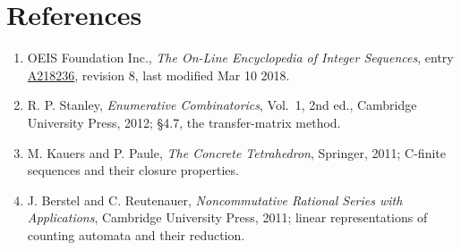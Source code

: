 \documentclass[11pt]{article}
\theoremstyle{definition}
\begin{document}
\section{References}

\begin{enumerate}

\item OEIS Foundation Inc., \emph{The On-Line Encyclopedia of Integer Sequences}, entry \href{https://oeis.org/A218236}{A218236}, revision 8, last modified Mar 10 2018.

\item R. P. Stanley, \emph{Enumerative Combinatorics}, Vol.~1, 2nd ed., Cambridge University Press, 2012; \S4.7, the transfer-matrix method.

\item M. Kauers and P. Paule, \emph{The Concrete Tetrahedron}, Springer, 2011; C-finite sequences and their closure properties.

\item J. Berstel and C. Reutenauer, \emph{Noncommutative Rational Series with Applications}, Cambridge University Press, 2011; linear representations of counting automata and their reduction.

\end{enumerate}
\end{document}
